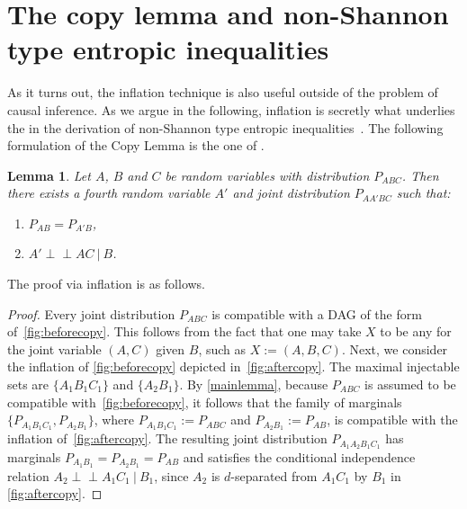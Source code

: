 \documentclass[aps,english,10pt,superscriptaddress,onecolumn,twoside,longbibliography,pra,floatfix,fleqn,nofootinbib]{revtex4-1}%
\newcommand*{\tblue}[1]{{\color{MidnightBlue}{\textbf{#1}}}}
\newtheorem{lemma}[theorem]{Lemma}
\theoremstyle{definition}
\newcommand{\indep}{\perp\!\!\!\!\perp} %
\begin{document}
\section{The copy lemma and non-Shannon type entropic inequalities}\label{sec:NonShannon}

As it turns out, the inflation technique is also useful outside of the problem of causal inference. As we argue in the following, inflation is secretly what underlies the \tblue{Copy Lemma} in the derivation of non-Shannon type entropic inequalities~\cite[Chapter~15]{yeung_network_2008}. The following formulation of the Copy Lemma is the one of \citet{kaced_equivalence_2013}.

\begin{lemma}
	Let $A$, $B$ and $C$ be random variables with distribution $P_{ABC}$. Then there exists a fourth random variable $A'$ and joint distribution $P_{AA'BC}$ such that:
	\begin{enumerate}
		\item $P_{AB} = P_{A'B}$,
		\item $A' \indep AC \:|\: B$.
	\label{copylemma}
	\end{enumerate}
\end{lemma}

The proof via inflation is as follows.
\begin{proof}
Every joint distribution $P_{ABC}$ is compatible with a DAG of the form of~\cref{fig:beforecopy}.  This follows from the fact that one may take $X$ to be any \tblue{sufficient statistic} for the joint variable $(A,C)$ given $B$, such as $X := (A,B,C)$.  Next, we consider the inflation of \cref{fig:beforecopy} depicted in~\cref{fig:aftercopy}. The maximal injectable sets are $\{ A_1 B_1 C_1\}$ and $\{A_2 B_1\}$.  By \cref{mainlemma}, because $P_{ABC}$ is assumed to be compatible with~\cref{fig:beforecopy}, it follows that the family of marginals $\{ P_{A_1 B_1 C_1}, P_{A_2 B_1}\}$, where $P_{A_1 B_1 C_1}:= P_{A B C}$ and $P_{A_2 B_1} := P_{AB}$, is compatible with the inflation of~\cref{fig:aftercopy}. The resulting joint distribution $P_{A_1 A_2 B_1 C_1}$ has marginals $P_{A_1 B_1}= P_{A_2 B_1} =P_{AB}$ and satisfies the conditional independence relation $A_2 \indep A_1 C_1 \:|\: B_1$, since $A_2$ is $d$-separated from $A_1 C_1$ by $B_1$ in \cref{fig:aftercopy}.
\end{proof}
\end{document}
